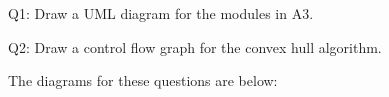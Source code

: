 \documentclass[12pt]{article}
\begin{document}
\newpage

\noindent Q1: Draw a UML diagram for the modules in A3.

\noindent Q2: Draw a control flow graph for the convex hull algorithm.

\noindent The diagrams for these questions are below:




\end{document}
